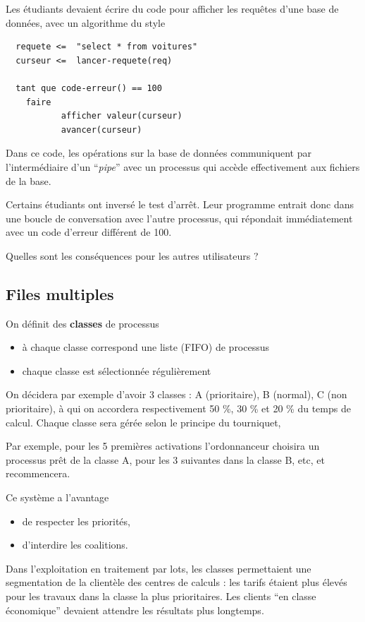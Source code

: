 \begin{multicols}{2}
\begin{exercice}
Les étudiants devaient écrire du code pour afficher les requêtes d'une base
de données, avec un algorithme du style
\begin{lstlisting}
  requete <=  "select * from voitures"
  curseur <=  lancer-requete(req) 

  tant que code-erreur() == 100
    faire 
           afficher valeur(curseur)
           avancer(curseur)
\end{lstlisting}
Dans ce code, les opérations sur la base de données 
communiquent par l'intermédiaire d'un ``\emph{pipe}'' avec
 un processus qui accède effectivement aux fichiers de la base.

Certains étudiants ont inversé le test d'arrêt. Leur programme entrait
donc dans une boucle de conversation avec l'autre processus, qui
répondait immédiatement avec un code d'erreur différent de 100.

Quelles sont les conséquences pour les autres utilisateurs ?
\end{exercice}

\subsection{Files multiples}


On définit des \textbf{classes} de processus
\begin{itemize}
\item à chaque classe correspond une liste (FIFO) de processus
\item chaque classe est sélectionnée régulièrement
\end{itemize}

On décidera par exemple d'avoir 3 classes : A (prioritaire), B
(normal), C (non prioritaire), à qui on accordera respectivement 50
\%, 30 \% et 20 \% du temps de calcul. Chaque classe sera gérée
selon le principe du tourniquet,

Par exemple, pour les 5 premières activations l'ordonnanceur choisira
un processus prêt de la classe A, pour les 3 suivantes dans la classe
B, etc, et recommencera.

Ce système a l'avantage
\begin{itemize}
\item de respecter les priorités,
\item d'interdire les coalitions.
\end{itemize}

Dans l'exploitation en traitement par lots, les classes permettaient
une segmentation de la clientèle des centres de calculs : les tarifs
étaient plus élevés pour les travaux dans la classe la plus
prioritaires. Les clients ``en classe économique'' devaient attendre
les résultats plus longtemps.


\end{multicols}


